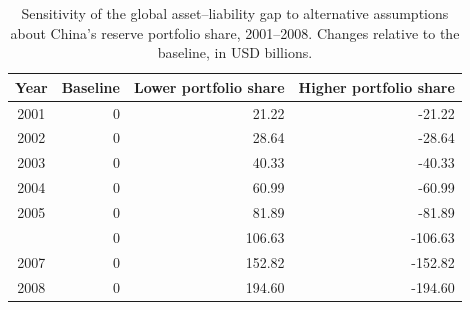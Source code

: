 \begin{table}

\caption{\label{tab:tab:sensitivity_china_gap}Sensitivity of the global asset--liability gap to alternative assumptions about China's reserve portfolio share, 2001--2008. Changes relative to the baseline, in USD billions.}
\centering
\begin{tabular}[t]{crrr}
\toprule
Year & Baseline & Lower portfolio share & Higher portfolio share\\
\midrule
2001 & 0 & 21.22 & -21.22\\
2002 & 0 & 28.64 & -28.64\\
2003 & 0 & 40.33 & -40.33\\
2004 & 0 & 60.99 & -60.99\\
2005 & 0 & 81.89 & -81.89\\
\addlinespace
2006 & 0 & 106.63 & -106.63\\
2007 & 0 & 152.82 & -152.82\\
2008 & 0 & 194.60 & -194.60\\
\bottomrule
\end{tabular}
\end{table}
